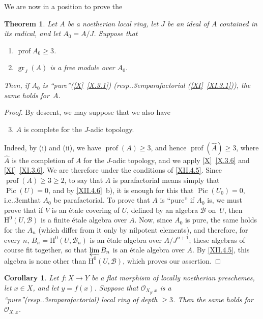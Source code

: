 \documentclass[11pt,a4paper,oneside]{book}
\providecommand{\sisi}[2]{#2}
\providecommand{\pageoriginale}{%
  \refstepcounter{pageoriginal}%
  \marginpar{\raggedright\footnotesize\bfseries\thepageoriginal}%
  \xspace}
\providecommand{\og}{``}
\providecommand{\fg}{''\xspace}
\providecommand{\ie}{i.e.\kern.3em}
\providecommand{\resp}{resp.\kern.3em}
\providecommand{\Bb}{\mathcal B}
\providecommand{\Oo}{\mathcal O}
\DeclareMathOperator{\gr}{gr}
\providecommand{\Pic}{\operatorname{Pic}}
\providecommand{\prof}{\operatorname{prof}}
\renewcommand{\H}{\mathrm H}
\providecommand{\skipqed}{\renewcommand{\qedsymbol}{}}
\newenvironment{enumeratei}
  {\begin{enumerate}[label=(\roman*)]}
  {\end{enumerate}}
\theoremstyle{plain}
\newtheorem{theoreme}[subsection]{Theorem}
\newtheorem{corollaire}[subsection]{Corollary}
\theoremstyle{definition}
\theoremstyle{remark}
\renewcommand{\Ref}[1]{\textup{\ref{#1}}}
\begin{document}
We are now in a position to prove the
\enlargethispage{-1\baselineskip}%
\begin{theoreme} \label{XII.4.7}
Let $A$ be a noetherian local ring, let $J$ be an ideal of $A$ contained in its radical, and let $A_0=A/J$. Suppose that
\begin{enumeratei}
\item
$\prof A_0\geq 3$.
\item
$\gr_J(A)$ is a free module over $A_0$.
\end{enumeratei}
\noindent
Then, if $A_0$ is \og pure\fg (\Ref{X}~\Ref{X.3.1}) (\resp parafactorial (\Ref{XI}~\Ref{XI.3.1})), the same holds for~$A$.
\end{theoreme}

\begin{proof}
By descent, we may suppose that we also have
\begin{enumeratei}\setcounter{enumi}{2}
\item
$A$ is complete for the $J$-adic topology.
\end{enumeratei}

Indeed, by (i) and (ii), we have $\prof(A)\geq 3$, and hence $\prof(\widehat{A})\geq 3$, where $\widehat{A}$ is the completion of $A$ for the $J$-adic topology, and we apply \Ref{X}~\Ref{X.3.6} and \Ref{XI}~\Ref{XI.3.6}. We are therefore under the conditions of \Ref{XII.4.5}. Since $\prof(A)\geq 3\geq 2$, to say that $A$ is parafactorial means simply that $\Pic(U)=0$, and by \Ref{XII.4.6}~b), it is enough for this that $\Pic(U_0)=0$, \ie that $A_0$ be parafactorial. To prove that $A$ is \og pure\fg if $A_0$ is, we must prove that if $V$ is an \'etale covering of $U$, defined by an algebra $\Bb$ on~$U$, then $\H^0(U, \Bb)$ is a finite \'etale algebra over $A$. Now, since $A_0$ is pure, the same holds for the $A_n$ (which differ from it only by nilpotent elements), and therefore, for every $n$, $\sisi{}{B_n=}\H^0(U, \Bb_n)$ is an \'etale algebra over $A/J^{n+1}$; these algebras of course fit together, so that $\varprojlim B_n$ is an \'etale algebra over $A$. By \Ref{XII.4.5}, this algebra is none other than $\H^0(U, \Bb)$, which proves our assertion.
\skipqed
\end{proof}

\begin{corollaire} \label{XII.4.8}
Let\pageoriginale $f:X\to Y$ be a flat morphism of locally noetherian preschemes, let $x\in X$, and let $y=f(x)$. Suppose that $\Oo_{X_y, x}$ is a \og pure\fg (\resp parafactorial) local ring of depth $\geq 3$. Then the same holds for $\Oo_{X, x}$.
\end{corollaire}
\end{document}
